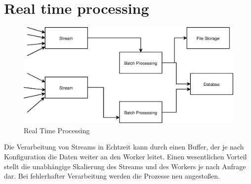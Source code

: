 \documentclass[
12pt,
english,
ngerman,
headsepline,
twoside,
openright,
numbers=noenddot,version=first
]{scrreprt}
\begin{document}
\section{Real time processing}
\begin{figure}[H]
	\centering
		\includegraphics[scale=0.60]{./pics/real-time-processing.eps}
	\caption{Real Time Processing}
	\label{pic:real-time-processing}
\end{figure}
Die Verarbeitung von Streams in Echtzeit kann durch einen Buffer, der je nach Konfiguration die Daten weiter an den Worker leitet. Einen wesentlichen Vorteil stellt die unabhängige Skalierung des Streams und des Workers je nach Anfrage dar. Bei fehlerhafter Verarbeitung werden die Prozesse neu angestoßen.
\\
\\




\end{document}
